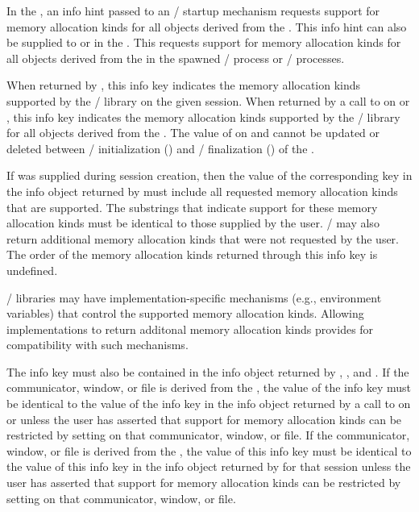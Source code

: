 In the \wpm{}, an info hint passed to an \MPI/ startup mechanism requests support for memory allocation kinds
for all objects derived from the \wpm{}.
%
This info hint can also be supplied to  or
 in the \wpm{}. This
requests support for memory allocation kinds
for all objects derived from the \wpm{} in the spawned \MPI/ process or \MPI/
processes.

When returned by , this info key indicates the
memory allocation kinds supported by the \MPI/ library on the given session.
%
When returned by a call to  on
 or , this info key indicates the
memory allocation kinds supported by the \MPI/ library for all objects derived
from the \wpm{}.
The value of  on  and
 cannot be updated or deleted between \MPI/ initialization
() and \MPI/ finalization () of the \wpm{}.

If  was supplied during session creation,
then the value of the corresponding key in the info object returned by
 must include all requested memory
allocation kinds that are supported.
%
The substrings that indicate support for these memory allocation kinds must be
identical to those supplied by the user.
%
\MPI/ may also return additional memory allocation kinds that were not requested by the user.
%
The order of the memory allocation kinds returned through this info key is
undefined.

\begin{rationale}
\MPI/ libraries may have implementation-specific mechanisms (e.g., environment
variables) that control the supported memory allocation kinds. Allowing
implementations to return additonal memory allocation kinds provides for
compatibility with such mechanisms.
\end{rationale}

The  info key must also be contained in the info
object returned by , ,
and .
%
If the communicator, window, or file is derived from the \wpm{}, the value of the 
info key must be identical to the value of the  info key in the info object
returned by a call to  on 
or  unless the user has asserted that support for
memory allocation kinds can be restricted by setting
 on that communicator, window, or file.
%
If the communicator, window, or file is derived from the \spm{}, the value of this
info key must be identical to the value of this info key in the info object
returned by  for that session unless the user
has asserted that support for memory allocation kinds can be restricted by
setting  on that communicator,
window, or file.

